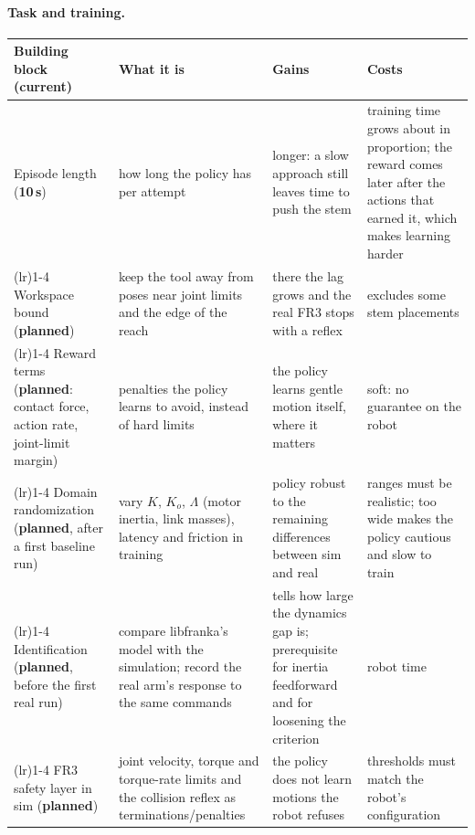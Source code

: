 \paragraph{Task and training.}
\begin{center}
{\small\renewcommand{\arraystretch}{1.2}
\begin{tabular}{>{\raggedright\arraybackslash}p{}>{\raggedright\arraybackslash}p{}>{\raggedright\arraybackslash}p{}>{\raggedright\arraybackslash}p{}}
  \toprule
  Building block (current) & What it is & Gains & Costs \\
  \midrule
  Episode length \newline (\textbf{10\,s})
    & how long the policy has per attempt
    & longer: a slow approach still leaves time to push the stem
    & training time grows about in proportion; the reward comes later after the actions that earned it, which makes
      learning harder \\
  \addlinespace\cmidrule(lr){1-4}\addlinespace
  Workspace bound \newline (\textbf{planned})
    & keep the tool away from poses near joint limits and the edge of the reach
    & there the lag grows and the real FR3 stops with a reflex
    & excludes some stem placements \\
  \addlinespace\cmidrule(lr){1-4}\addlinespace
  Reward terms \newline (\textbf{planned}: contact force, action rate, joint-limit margin)
    & penalties the policy learns to avoid, instead of hard limits
    & the policy learns gentle motion itself, where it matters
    & soft: no guarantee on the robot \\
  \addlinespace\cmidrule(lr){1-4}\addlinespace
  Domain randomization \newline (\textbf{planned}, after a first baseline run)
    & vary $K$, $K_o$, $\Lambda$ (motor inertia, link masses), latency and friction in training
    & policy robust to the remaining differences between sim and real~\cite{al-peng2018}
    & ranges must be realistic; too wide makes the policy cautious and slow to train \\
  \addlinespace\cmidrule(lr){1-4}\addlinespace
  Identification \newline (\textbf{planned}, before the first real run)
    & compare libfranka's model with the simulation; record the real arm's response to the same commands
    & tells how large the dynamics gap is; prerequisite for inertia feedforward and for loosening the criterion
    & robot time \\
  \addlinespace\cmidrule(lr){1-4}\addlinespace
  FR3 safety layer in sim \newline (\textbf{planned})
    & joint velocity, torque and torque-rate limits and the collision reflex as terminations/penalties
    & the policy does not learn motions the robot refuses
    & thresholds must match the robot's configuration \\
  \bottomrule
\end{tabular}}
\end{center}

